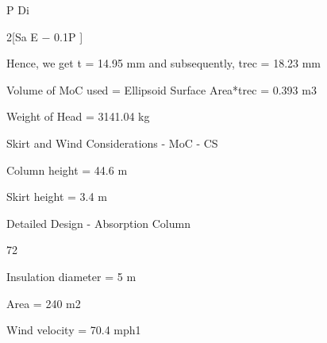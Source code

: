 \documentclass[a4paper,portrait,12pt]{article}
\begin{document}
\begin{flushleft}
P Di
\end{flushleft}


\begin{flushleft}
2[Sa E $-$ 0.1P ]
\end{flushleft}





\begin{flushleft}
Hence, we get t = 14.95 mm and subsequently, trec = 18.23 mm
\end{flushleft}


\begin{flushleft}
Volume of MoC used = Ellipsoid Surface Area*trec = 0.393 m3
\end{flushleft}


\begin{flushleft}
Weight of Head = 3141.04 kg
\end{flushleft}


\begin{flushleft}
Skirt and Wind Considerations - MoC - CS
\end{flushleft}


\begin{flushleft}
Column height = 44.6 m
\end{flushleft}


\begin{flushleft}
Skirt height = 3.4 m
\end{flushleft}





\begin{flushleft}
\newpage
Detailed Design - Absorption Column
\end{flushleft}





72





\begin{flushleft}
Insulation diameter = 5 m
\end{flushleft}


\begin{flushleft}
Area = 240 m2
\end{flushleft}


\begin{flushleft}
Wind velocity = 70.4 mph1
\end{flushleft}
\end{document}
